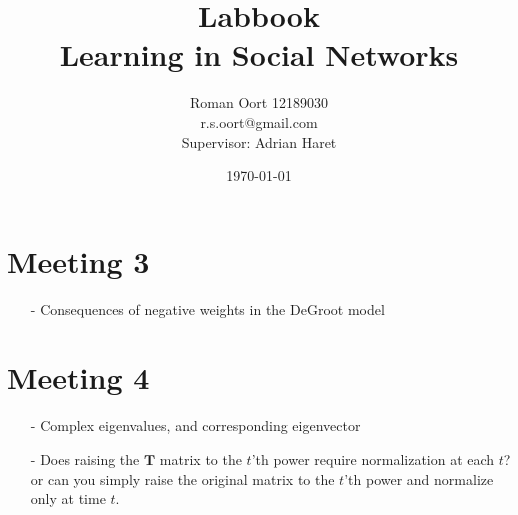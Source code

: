 \documentclass{article}
\title{Labbook \\ Learning in Social Networks}
\author{Roman Oort 12189030\\ r.s.oort@gmail.com\\[1cm]{\normal Supervisor: Adrian Haret}}
\date{\today}
\begin{document}
\section{Meeting 3}
\begin{itemize}
    \item[-] Consequences of negative weights in the DeGroot model
\end{itemize}

\section{Meeting 4}
\begin{itemize}
    \item[-] Complex eigenvalues, and corresponding eigenvector
    \item[-] Does raising the $\textbf{T}$ matrix to the $t$'th power require normalization at each $t$? or can you simply raise the original matrix to the $t$'th power and normalize only at time $t$.
\end{itemize}
\end{document}
